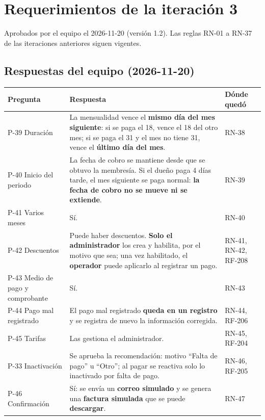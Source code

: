 \section{Requerimientos de la iteración 3}
Aprobados por el equipo el 2026-11-20 (versión 1.2). Las reglas RN-01 a RN-37 de las iteraciones anteriores siguen vigentes.

\subsection{Respuestas del equipo (2026-11-20)}

\begin{longtable}{>{\raggedright\arraybackslash}p{2.4000000000000004cm}>{\raggedright\arraybackslash}p{10.5cm}>{\raggedright\arraybackslash}p{1.5cm}}
\toprule
\textbf{Pregunta} & \textbf{Respuesta} & \textbf{Dónde quedó}\\
\midrule\endhead
P-39 Duración & La mensualidad vence el \textbf{mismo día del mes siguiente}: si se paga el 18, vence el 18 del otro mes; si se paga el 31 y el mes no tiene 31, vence el \textbf{último día del mes}. & RN-38\\
P-40 Inicio del periodo & La fecha de cobro se mantiene desde que se obtuvo la membresía. Si el dueño paga 4 días tarde, el mes siguiente se paga normal: \textbf{la fecha de cobro no se mueve ni se extiende}. & RN-39\\
P-41 Varios meses & Sí. & RN-40\\
P-42 Descuentos & Puede haber descuentos. \textbf{Solo el administrador} los crea y habilita, por el motivo que sea; una vez habilitado, el \textbf{operador} puede aplicarlo al registrar un pago. & RN-41, RN-42, RF-208\\
P-43 Medio de pago y comprobante & Sí. & RN-43\\
P-44 Pago mal registrado & El pago mal registrado \textbf{queda en un registro} y se registra de nuevo la información corregida. & RN-44, RF-206\\
P-45 Tarifas & Las gestiona el administrador. & RN-45, RF-204\\
P-33 Inactivación & Se aprueba la recomendación: motivo ``Falta de pago'' u ``Otro''; al pagar se reactiva solo lo inactivado por falta de pago. & RN-46, RF-205\\
P-46 Confirmación & Sí: se envía un \textbf{correo simulado} y se genera una \textbf{factura simulada} que se puede \textbf{descargar}. & RN-47\\

\end{longtable}
